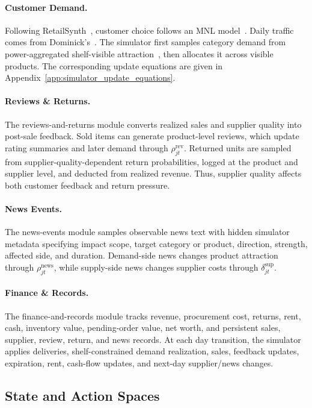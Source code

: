 \paragraph{Customer Demand.}
Following RetailSynth~\citep{xia2023retailsynth}, customer choice follows an MNL model~\citep{mcfadden_conditional_1974}. Daily traffic comes from Dominick's~\citep{DominicksDataset}. The simulator first samples category demand from power-aggregated shelf-visible attraction~\citep{nakanishi1974mci}, then allocates it across visible products. The corresponding update equations are given in Appendix~\ref{app:simulator_update_equations}.

\paragraph{Reviews \& Returns.}
The reviews-and-returns module converts realized sales and supplier quality into post-sale feedback. Sold items can generate product-level reviews, which update rating summaries and later demand through $\rho^{\mathrm{rev}}_{jt}$. Returned units are sampled from supplier-quality-dependent return probabilities, logged at the product and supplier level, and deducted from realized revenue. Thus, supplier quality affects both customer feedback and return pressure.

\paragraph{News Events.}
The news-events module samples observable news text with hidden simulator metadata specifying impact scope, target category or product, direction, strength, affected side, and duration. Demand-side news changes product attraction through $\rho^{\mathrm{news}}_{jt}$, while supply-side news changes supplier costs through $\delta^{\mathrm{sup}}_{jt}$.

\paragraph{Finance \& Records.}
The finance-and-records module tracks revenue, procurement cost, returns, rent, cash, inventory value, pending-order value, net worth, and persistent sales, supplier, review, return, and news records. At each day transition, the simulator applies deliveries, shelf-constrained demand realization, sales, feedback updates, expiration, rent, cash-flow updates, and next-day supplier/news changes.

\subsection{State and Action Spaces}
\label{app:state_action_spaces}


